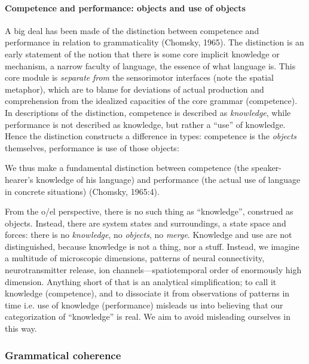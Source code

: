 \paragraph{Competence and performance: objects and use of objects}

A big deal has been made of the distinction between competence and performance in relation to grammaticality (Chomsky, 1965). The distinction is an early statement of the notion that there is some core implicit knowledge or mechanism, a narrow faculty of language, the essence of what language is. This core module is \textit{separate} \textit{from} the sensorimotor interfaces (note the spatial metaphor), which are to blame for deviations of actual production and comprehension from the idealized capacities of the core grammar (competence). In descriptions of the distinction, competence is described as \textit{knowledge}, while performance is not described as knowledge, but rather a “use” of knowledge. Hence the distinction constructs a difference in types: competence is the \textit{objects} themselves, performance is use of those objects:

We thus make a fundamental distinction between competence (the speaker-hearer's knowledge of his language) and performance (the actual use of language in concrete situations) (Chomsky, 1965:4).

  From the o/el perspective, there is no such thing as “knowledge”, construed as objects. Instead, there are system states and surroundings, a state space and forces: there is no \textit{knowledge}, no \textit{objects}, no \textit{merge}. Knowledge and use are not distinguished, because knowledge is not a thing, nor a stuff. Instead, we imagine a multitude of microscopic dimensions, patterns of neural connectivity, neurotransmitter release, ion channels—spatiotemporal order of enormously high dimension. Anything short of that is an analytical simplification; to call it knowledge (competence), and to dissociate it from observations of patterns in time i.e. use of knowledge (performance) misleads us into believing that our categorization of “knowledge” is real. We aim to avoid misleading ourselves in this way.

\subsubsection{Grammatical coherence}

